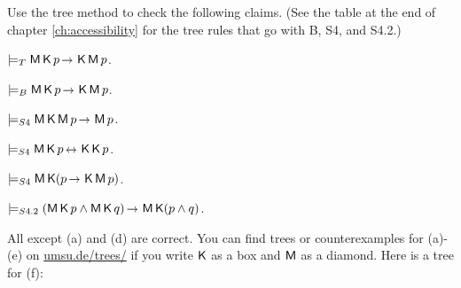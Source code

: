 \begin{exercise}
  Use the tree method to check the following claims. (See the table at the end
  of chapter \ref{ch:accessibility} for the tree rules that go with B, S4, and
  S4.2.)
  \begin{exlist}
  \item $\models_{T} \Mi\Kn p \to \Kn\Mi p$.
  \item $\models_{B} \Mi\Kn p \to \Kn\Mi p$.
  \item $\models_{S4} \Mi\Kn\Mi p \to \Mi p$.
  \item $\models_{S4} \Mi\Kn p \leftrightarrow \Kn\Kn p$.
  \item $\models_{S4} \Mi\Kn(p \to \Kn\Mi p)$.
  \item $\models_{S4.2} (\Mi\Kn p \land \Mi\Kn q) \to \Mi \Kn(p \land q)$.
  \end{exlist}
\end{exercise}
\begin{solution}
  All except (a) and (d) are correct. You can find trees or counterexamples for (a)-(e) on
  \href{https://www.umsu.de/trees/}{umsu.de/trees/} if
  you write $\operatorname{\mathsf{K}{}}$ as a box and $\operatorname{\mathsf{M}}$ as a diamond. Here is a tree for (f):
  \begin{center}
  \end{center}
\end{solution}


